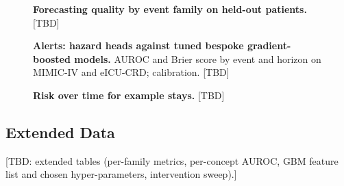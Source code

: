\documentclass[pdflatex,sn-nature]{sn-jnl}
\begin{document}
\begin{figure}[h]
\centering
\caption{\textbf{Forecasting quality by event family on held-out patients.} [TBD]}\label{fig:forecast}
\end{figure}

\begin{figure}[h]
\centering
\caption{\textbf{Alerts: hazard heads against tuned bespoke gradient-boosted models.} AUROC and Brier score by event and horizon on MIMIC-IV and eICU-CRD; calibration. [TBD]}\label{fig:alerts}
\end{figure}

\begin{figure}[h]
\centering
\caption{\textbf{Risk over time for example stays.} [TBD]}\label{fig:traces}
\end{figure}

\begin{appendices}
\section{Extended Data}\label{sec:extended}
[TBD: extended tables (per-family metrics, per-concept AUROC, GBM feature list and chosen hyper-parameters, intervention sweep).]
\end{appendices}


\end{document}
